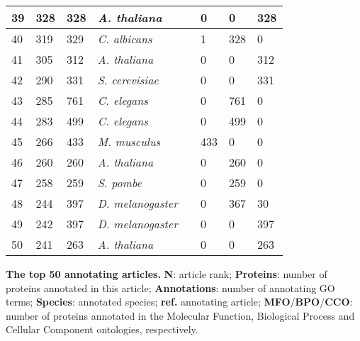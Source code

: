 \begin{longtable}[!ht]{|l|l|l|l|l|l|l|l|}
39 & 328 & 328 & \textit{A. thaliana} & \cite{pmid12938931} & 0 & 0 & 328\\ \hline
40 & 319 & 329 & \textit{C. albicans} & \cite{pmid16336044} & 1 & 328 & 0\\ \hline
41 & 305 & 312 & \textit{A. thaliana} & \cite{pmid18633119} & 0 & 0 & 312\\ \hline
42 & 290 & 331 & \textit{S. cerevisiae} & \cite{pmid11914276} & 0 & 0 & 331\\ \hline
43 & 285 & 761 & \textit{C. elegans} & \cite{pmid11099033} & 0 & 761 & 0\\ \hline
44 & 283 & 499 & \textit{C. elegans} & \cite{pmid11099034} & 0 & 499 & 0\\ \hline
45 & 266 & 433 & \textit{M. musculus} & \cite{pmid11591653} & 433 & 0 & 0\\ \hline
46 & 260 & 260 & \textit{A. thaliana} & \cite{pmid16502469} & 0 & 260 & 0\\ \hline
47 & 258 & 259 & \textit{S. pombe} & \cite{pmid12529438} & 0 & 259 & 0\\ \hline
48 & 244 & 397 &  \textit{D. melanogaster} & \cite{pmid17412918} & 0 & 367 & 30\\ \hline
49 & 242 & 397 &  \textit{D. melanogaster} & \cite{pmid18981222} & 0 & 0 & 397\\ \hline
50 & 241 & 263 & \textit{A. thaliana} & \cite{pmid16287169} & 0 & 0 & 263\\ \hline
\end{longtable}
\begin{flushleft} {\bf The top 50 annotating articles.} \textbf{N}:
article rank; \textbf{Proteins}: number of proteins annotated in this
article; \textbf{Annotations}: number of annotating
GO terms; \textbf{Species}: annotated species; \textbf{ref.} annotating
article; \textbf{MFO}/\textbf{BPO}/\textbf{CCO}: number of proteins
annotated in the Molecular Function, Biological Process and Cellular
Component ontologies, respectively.
\end{flushleft}
